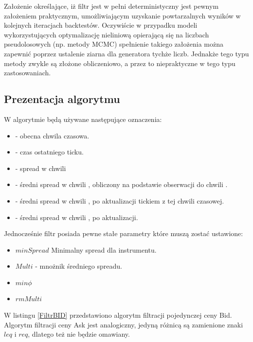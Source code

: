 \documentclass[a4paper,12pt,openany, DIV=calc, headsepline]{scrbook}
\begin{document}
Założenie określające, iż filtr jest w pełni deterministyczny jest pewnym założeniem praktycznym, umożliwiającym uzyskanie powtarzalnych wyników w kolejnych iteracjach backtestów. Oczywiście w przypadku modeli wykorzystujących optymalizację nieliniową opierającą się na liczbach pseudolosowych (np. metody MCMC) spełnienie takiego założenia można zapewnić poprzez ustalenie ziarna dla generatora tychże liczb. Jednakże tego typu metody zwykle są złożone obliczeniowo, a przez to niepraktyczne w tego typu zastosowaniach.  




\subsection{Prezentacja algorytmu}

W algorytmie będą używane następujące oznaczenia:

\begin{itemize}
\item \ts - obecna chwila czasowa.
\item \tsl - czas ostatniego ticku.
\item \Spt  - spread w chwili \ts
\item \MSpc - średni spread w chwili \ts, obliczony na podstawie obserwacji do chwili \tsl.
\item \MSpn - średni spread w chwili \ts, po aktualizacji tickiem z tej chwili czasowej.
\item \MSpo - średni spread w chwili \tsl, po aktualizacji.
\end{itemize}

Jednocześnie filtr posiada pewne stałe parametry które muszą zostać ustawione:

\begin{itemize}
\item $minSpread$ Minimalny spread dla instrumentu.
\item $Multi$ - mnożnik średniego spreadu.
\item $min\phi$
\item $rmMulti$
\end{itemize}

W listingu \ref{FiltrBID} przedstawiono algorytm filtracji pojedynczej ceny Bid. Algorytm filtracji ceny Ask jest analogiczny, jedyną różnicą są zamienione znaki $leq$ i $req$, dlatego też nie będzie omawiany.
\end{document}
